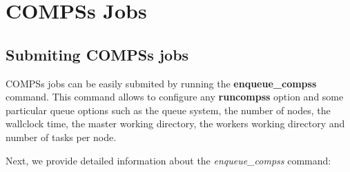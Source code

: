 \section{COMPSs Jobs}
\label{sec:Jobs}

\subsection{Submiting COMPSs jobs}
COMPSs jobs can be easily submited by running the \textbf{enqueue\_compss} command. This command allows to configure any 
\textbf{runcompss} option and some particular queue options such as the queue system, the number of nodes, the wallclock time,
the master working directory, the workers working directory and number of tasks per node.

Next, we provide detailed information about the \textit{enqueue\_compss} command:

